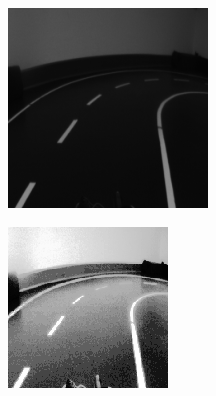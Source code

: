\begin{figure}[h]
	\centering
	\begin{subfigure}{.33\textwidth}
	\centering
		  \includegraphics[width=0.9\linewidth]{figures/200x200.png}
	 	  \caption{}
		  \label{fig:imagea}
	\end{subfigure}%
	\begin{subfigure}{.33\textwidth}
	\centering
		  \includegraphics[width=0.9\linewidth]{figures/200x200Hist.png}

\end{subfigure}
\end{figure}
